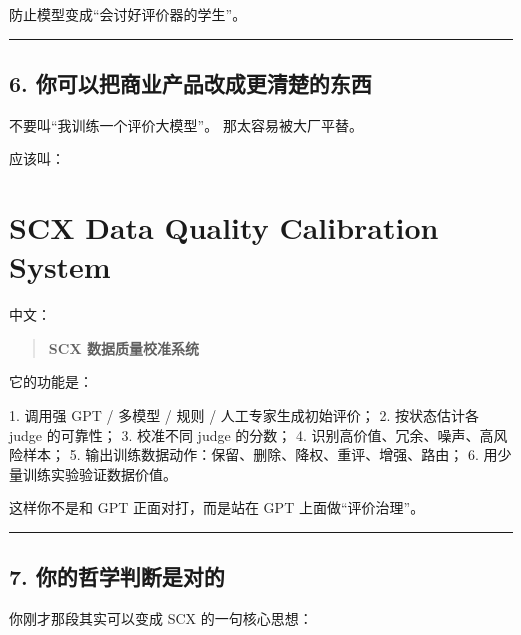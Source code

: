\documentclass[
  12pt,
]{ctexart}
\newenvironment{Shaded}{}{}
\newcommand{\NormalTok}[1]{#1}
\begin{document}
防止模型变成``会讨好评价器的学生''。

\begin{center}\rule{0.5\linewidth}{0.5pt}\end{center}

\subsection{6.
你可以把商业产品改成更清楚的东西}\label{ux4f60ux53efux4ee5ux628aux5546ux4e1aux4ea7ux54c1ux6539ux6210ux66f4ux6e05ux695aux7684ux4e1cux897f}

不要叫``我训练一个评价大模型''。 那太容易被大厂平替。

应该叫：

\section{\texorpdfstring{\textbf{SCX Data Quality Calibration
System}}{SCX Data Quality Calibration System}}\label{scx-data-quality-calibration-system}

中文：

\begin{quote}
\textbf{SCX 数据质量校准系统}
\end{quote}

它的功能是：

\begin{Shaded}
\begin{Highlighting}[]
\NormalTok{1. 调用强 GPT / 多模型 / 规则 / 人工专家生成初始评价；}
\NormalTok{2. 按状态估计各 judge 的可靠性；}
\NormalTok{3. 校准不同 judge 的分数；}
\NormalTok{4. 识别高价值、冗余、噪声、高风险样本；}
\NormalTok{5. 输出训练数据动作：保留、删除、降权、重评、增强、路由；}
\NormalTok{6. 用少量训练实验验证数据价值。}
\end{Highlighting}
\end{Shaded}

这样你不是和 GPT 正面对打，而是站在 GPT 上面做``评价治理''。

\begin{center}\rule{0.5\linewidth}{0.5pt}\end{center}

\subsection{7.
你的哲学判断是对的}\label{ux4f60ux7684ux54f2ux5b66ux5224ux65adux662fux5bf9ux7684}

你刚才那段其实可以变成 SCX 的一句核心思想：
\end{document}
